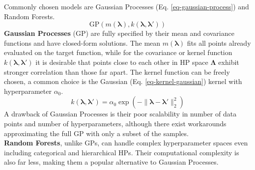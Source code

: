 \documentclass[twoside,11pt]{article}
\begin{document}
Commonly chosen models are Gaussian Processes (Eq. \ref{eq-gaussian-process}) and Random Forests.
\begin{equation}
  \text{GP}(m(\boldsymbol\lambda), k(\boldsymbol\lambda,\boldsymbol\lambda'))
  \label{eq-gaussian-process}
\end{equation}
\textbf{Gaussian Processes} (GP) are fully specified by their mean and covariance functions and have closed-form solutions.
The mean $m(\boldsymbol\lambda)$ fits all points already evaluated on the target function, while for the covariance or
kernel function $k(\boldsymbol\lambda,\boldsymbol\lambda')$ it is desirable that points close to
each other in HP space $\boldsymbol\Lambda$ exhibit stronger correlation than those far apart.
The kernel function can be freely chosen, a common choice is the Gaussian (Eq. \ref{eq-kernel-gaussian}) kernel with
hyperparameter $\alpha_0$. \citep[p. 5]{frazier2018tutorialbayesianoptimization}
\begin{equation}
  k(\boldsymbol\lambda,\boldsymbol\lambda')=\alpha_0 \exp(-\|\boldsymbol\lambda-\boldsymbol\lambda'\|_2^2)
  \label{eq-kernel-gaussian}
\end{equation}
A drawback of Gaussian Processes is their poor scalability in number of data points and number of hyperparameters, although there exist workarounds approximating the full GP
with only a subset of the samples. \citep[pp. 10f]{feurer_hyperparameter_2019}
\\
\textbf{Random Forests}, unlike GPs, can handle complex hyperparameter spaces even including categorical and hierarchical HPs. Their computational complexity is also far
less, making them a popular alternative to Gaussian Processes. \citep[p. 12]{feurer_hyperparameter_2019}

  
\end{document}
